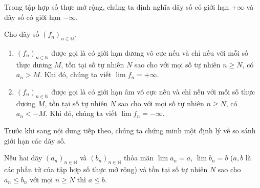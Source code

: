 Trong tập hợp số thực mở rộng, chúng ta định nghĩa dãy số có giới hạn $+\infty$ và dãy số có giới hạn $-\infty$.
\begin{definition}
    Cho dãy số ${(f_{n})}_{n\in\mathbb{N}}$.
    \begin{enumerate}[label={(\roman*)}]
        \item ${(f_{n})}_{n\in\mathbb{N}}$ được gọi là có giới hạn dương vô cực nếu và chỉ nếu với mỗi số thực dương $M$, tồn tại số tự nhiên $N$ sao cho với mọi số tự nhiên $n\geq N$, có $a_{n} > M$. Khi đó, chúng ta viết $\lim f_{n} = +\infty$.
        \item ${(f_{n})}_{n\in\mathbb{N}}$ được gọi là có giới hạn âm vô cực nếu và chỉ nếu với mỗi số thực dương $M$, tồn tại số tự nhiên $N$ sao cho với mọi số tự nhiên $n\geq N$, có $a_{n} < -M$. Khi đó, chúng ta viết $\lim f_{n} = -\infty$.
    \end{enumerate}
\end{definition}

Trước khi sang nội dung tiếp theo, chúng ta chứng minh một định lý về so sánh giới hạn các dãy số.
\begin{theorem}\label{theorem:order-of-convergent-sequences}
    Nếu hai dãy ${(a_{n})}_{n\in\mathbb{N}}$ và ${(b_{n})}_{n\in\mathbb{N}}$ thỏa mãn $\lim a_{n} = a$, $\lim b_{n} = b$ ($a, b$ là các phần tử của tập hợp số thực mở rộng) và tồn tại số tự nhiên $N$ sao cho $a_{n}\leq b_{n}$ với mọi $n\geq N$ thì $a\leq b$.
\end{theorem}

